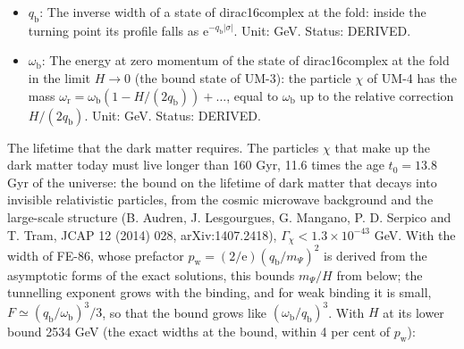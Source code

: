\documentclass[
  10pt,
]{article}
\begin{document}
\begin{itemize}
  particle \(\chi\) in the limit \(H/q_{\mathrm{b}} \to 0\),
  \(\upsilon_{\mathrm{r}} = \omega_{\mathrm{r}}/m_\Psi\) that of the
  real part of its resonance. Unit: dimensionless. Status: DERIVED.
\item
  \(q_{\mathrm{b}}\): The inverse width of a state of dirac16complex at
  the fold: inside the turning point its profile falls as
  \(\mathrm{e}^{-q_{\mathrm{b}}\lvert\sigma\rvert}\). Unit: GeV. Status:
  DERIVED.
\item
  \(\omega_{\mathrm{b}}\): The energy at zero momentum of the state of
  dirac16complex at the fold in the limit \(H \to 0\) (the bound state
  of UM-3): the particle \(\chi\) of UM-4 has the mass
  \(\omega_{\mathrm{r}} = \omega_{\mathrm{b}}(1 - H/(2q_{\mathrm{b}})) + \dots\),
  equal to \(\omega_{\mathrm{b}}\) up to the relative correction
  \(H/(2q_{\mathrm{b}})\). Unit: GeV. Status: DERIVED.
\end{itemize}

The lifetime that the dark matter requires. The particles \(\chi\) that
make up the dark matter today must live longer than 160 Gyr, 11.6 times
the age \(t_0 = 13.8\) Gyr of the universe: the bound on the lifetime of
dark matter that decays into invisible relativistic particles, from the
cosmic microwave background and the large-scale structure (B. Audren, J.
Lesgourgues, G. Mangano, P. D. Serpico and T. Tram, JCAP 12 (2014) 028,
arXiv:1407.2418), \(\Gamma_\chi < 1.3\times10^{-43}\) GeV. With the
width of FE-86, whose prefactor
\(p_{\mathrm{w}} = (2/\mathrm{e})(q_{\mathrm{b}}/m_\Psi)^2\) is derived
from the asymptotic forms of the exact solutions, this bounds
\(m_\Psi/H\) from below; the tunnelling exponent grows with the binding,
and for weak binding it is small,
\(F \simeq (q_{\mathrm{b}}/\omega_{\mathrm{b}})^3/3\), so that the bound
grows like \((\omega_{\mathrm{b}}/q_{\mathrm{b}})^3\). With \(H\) at its
lower bound 2534 GeV (the exact widths at the bound, within 4 per cent
of \(p_{\mathrm{w}}\)):
\end{document}
